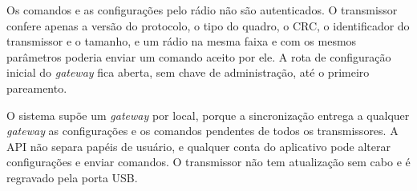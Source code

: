 Os comandos e as configurações pelo rádio não são autenticados. O transmissor confere apenas a versão do protocolo, o tipo do quadro, o CRC, o identificador do transmissor e o tamanho, e um rádio na mesma faixa e com os mesmos parâmetros poderia enviar um comando aceito por ele. A rota de configuração inicial do \textit{gateway} fica aberta, sem chave de administração, até o primeiro pareamento.

O sistema supõe um \textit{gateway} por local, porque a sincronização entrega a qualquer \textit{gateway} as configurações e os comandos pendentes de todos os transmissores. A API não separa papéis de usuário, e qualquer conta do aplicativo pode alterar configurações e enviar comandos. O transmissor não tem atualização sem cabo e é regravado pela porta USB.
